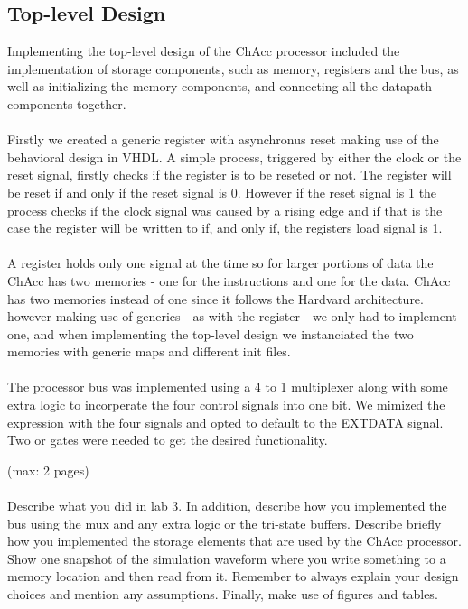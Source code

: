 \documentclass[a4paper,11pt]{article}
\begin{document}
\subsection{Top-level Design}
Implementing the top-level design of the ChAcc processor included the 
implementation of storage components, such as memory, registers and the 
bus, as well as initializing the memory components, and connecting all the 
datapath components together.\\\\
\noindent
Firstly we created a generic register with asynchronus reset making use 
of the behavioral design in VHDL. A simple process, triggered by either 
the clock or the reset signal, firstly checks if the register is to be reseted 
or not. The register will be reset if and only if the reset signal is 0. 
However if the reset signal is 1 the process checks if the clock signal was 
caused by a rising edge and if that is the case the register will be written 
to if, and only if, the registers load signal is 1.\\\\
\noindent
A register holds only one signal at the time so for larger portions of data 
the ChAcc has two memories - one for the instructions and one for the data. 
ChAcc has two memories instead of one since it follows the Hardvard 
architecture. however making use of generics - as with the register - we only 
had to implement one, and when implementing the top-level design we 
instanciated the two memories with generic maps and different init files.\\\\
\noindent
The processor bus was implemented using a 4 to 1 multiplexer along with some 
extra logic to incorperate the four control signals into one bit. We mimized 
the expression with the four signals and opted to default to the EXTDATA 
signal. Two or gates were needed to get the desired functionality.

(max: 2 pages)
\\\\
Describe what you did in lab 3. In addition, describe how you implemented the bus using the mux and any extra logic or the tri-state buffers. Describe briefly how you implemented the storage elements that are used by the ChAcc processor. Show one snapshot of the simulation waveform where you write something to a memory location and then read from it. Remember to always explain your design choices and mention any assumptions. Finally, make use of figures and tables. 
\end{document}
